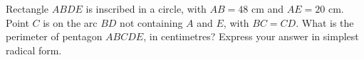 Rectangle $ABDE$ is inscribed in a circle, with $AB=48$ cm and $AE=20$ cm. Point $C$ is on the arc $BD$ not containing $A$ and $E$, with $BC=CD$. What is the perimeter of pentagon $ABCDE$, in centimetres? Express your answer in simplest radical form.

